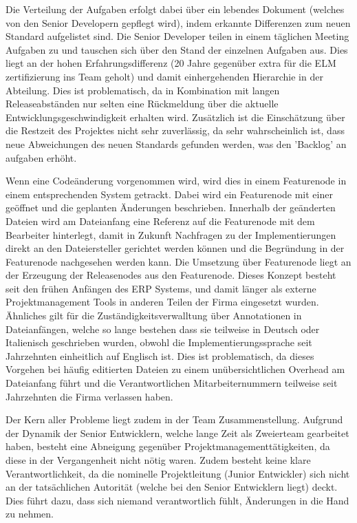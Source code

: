 Die Verteilung der Aufgaben erfolgt dabei über ein lebendes Dokument (welches von den Senior Developern gepflegt wird), indem erkannte Differenzen zum neuen Standard aufgelistet sind. Die Senior Developer teilen in einem täglichen Meeting Aufgaben zu und tauschen sich über den Stand der einzelnen Aufgaben aus.
Dies liegt an der hohen Erfahrungsdifferenz (20 Jahre gegenüber extra für die ELM zertifizierung ins Team geholt) und damit einhergehenden Hierarchie in der Abteilung.
Dies ist problematisch, da in Kombination mit langen Releaseabständen nur selten eine Rückmeldung über die aktuelle Entwicklungsgeschwindigkeit erhalten wird. Zusätzlich ist die Einschätzung über die Restzeit des Projektes nicht sehr zuverlässig, da sehr wahrscheinlich ist, dass neue Abweichungen des neuen Standards gefunden werden, was den 'Backlog' an aufgaben erhöht.

Wenn eine Codeänderung vorgenommen wird, wird dies in einem Featurenode in einem entsprechenden System getrackt. Dabei wird ein Featurenode mit einer geöffnet und die geplanten Änderungen beschrieben. Innerhalb der geänderten Dateien wird am Dateianfang eine Referenz auf die Featurenode mit dem Bearbeiter hinterlegt, damit in Zukunft Nachfragen zu der Implementierungen direkt an den Dateiersteller gerichtet werden können und die Begründung in der Featurenode nachgesehen werden kann.
Die Umsetzung über Featurenode liegt an der Erzeugung der Releasenodes aus den Featurenode. Dieses Konzept besteht seit den frühen Anfängen des ERP Systems, und damit länger als externe Projektmanagement Tools in anderen Teilen der Firma eingesetzt wurden. Ähnliches gilt für die Zuständigkeitsverwalltung über Annotationen in Dateianfängen, welche so lange bestehen dass sie teilweise in Deutsch oder Italienisch geschrieben wurden, obwohl die Implementierungssprache seit Jahrzehnten einheitlich auf Englisch ist.
Dies ist problematisch, da dieses Vorgehen bei häufig editierten Dateien zu einem unübersichtlichen Overhead am Dateianfang führt und die Verantwortlichen Mitarbeiternummern teilweise seit Jahrzehnten die Firma verlassen haben.

Der Kern aller Probleme liegt zudem in der Team Zusammenstellung. Aufgrund der Dynamik der Senior Entwicklern, welche lange Zeit als Zweierteam gearbeitet haben, besteht eine Abneigung gegenüber Projektmanagementtätigkeiten, da diese in der Vergangenheit nicht nötig waren. Zudem besteht keine klare Verantwortlichkeit, da die nominelle Projektleitung (Junior Entwickler) sich nicht an der tatsächlichen Autorität (welche bei den Senior Entwicklern liegt) deckt. Dies führt dazu, dass sich niemand verantwortlich fühlt, Änderungen in die Hand zu nehmen.

